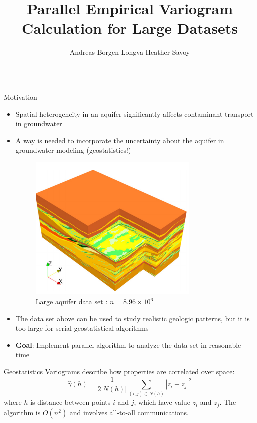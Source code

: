 \documentclass[serif,mathserif,final]{beamer}
\title{Parallel Empirical Variogram Calculation for Large Datasets}
\author{Andreas Borgen Longva \quad Heather Savoy}
\institute{University of California, Berkeley}
\begin{document}
\begin{frame}{}
  \begin{columns}[t]

    \begin{column}{0.32\linewidth}

      \begin{block}{Motivation}
   
	 \begin{itemize}
	 	\item Spatial heterogeneity in an aquifer significantly affects contaminant transport in groundwater
		\item A way is needed to incorporate the uncertainty about the aquifer in groundwater modeling (geostatistics!)
         
         \begin{figure}[htbp]
            \centering
            \includegraphics[height=7cm]{herten.png} %
            \caption{Large aquifer data set : $n=8.96\times 10^6$ \cite{Comunian2011a}}
            \label{fig:example}
         \end{figure}
         
         \item The data set above can be used to study realistic geologic patterns, but it is too large for serial geostatistical algorithms
         \item \textbf{Goal}: Implement parallel algorithm to analyze the data set in reasonable time
          \end{itemize}
      \end{block}

      \begin{block}{Geostatistics}
      Variograms describe how properties are correlated over space:
        \begin{equation*}
		\hat{\gamma}(h)=\frac{1}{2|N(h)|}\sum_{(i,j)\in N(h)} |z_i-z_j|^2
	\end{equation*}
	where $h$ is distance between points $i$ and $j$, which have value $z_i$ and $z_j$. The algorithm is $O(n^2)$ and involves all-to-all communications.
	

\end{block}
\end{column}
\end{columns}
\end{frame}
\end{document}
